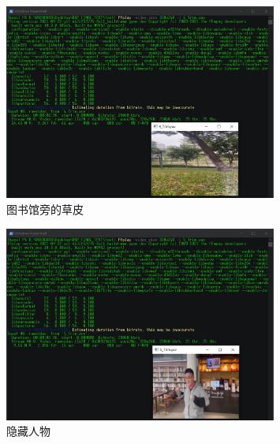 \documentclass[10pt,UTF8]{ctexart}
\begin{document}
\begin{figure}[H]
\centering 
\includegraphics[width=0.80\textwidth]{4.png} 
\caption{图书馆旁的草皮}
\label{Test}
\end{figure}

\begin{figure}[H]
\centering 
\includegraphics[width=0.80\textwidth]{5.png} 
\caption{隐藏人物}
\label{Test}
\end{figure}

\newpage








\clearpage
\end{document}
